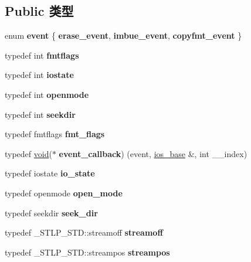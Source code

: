 \subsection*{Public 类型}
\begin{DoxyCompactItemize}
\item 
\mbox{\label{classios__base_ac76e71dcaa651be2091a967c0e2f7369}} 
enum {\bfseries event} \{ {\bfseries erase\+\_\+event}, 
{\bfseries imbue\+\_\+event}, 
{\bfseries copyfmt\+\_\+event}
 \}
\item 
\mbox{\label{classios__base_a74902bbe102cf0cbbbe7c93a47373581}} 
typedef int {\bfseries fmtflags}
\item 
\mbox{\label{classios__base_a71b7ab8328b5c7e7ec684acbdf14eddd}} 
typedef int {\bfseries iostate}
\item 
\mbox{\label{classios__base_a60aa901230527f9e3c253b9f39006925}} 
typedef int {\bfseries openmode}
\item 
\mbox{\label{classios__base_aac08884b8dcc93be02c6c4de662bbea0}} 
typedef int {\bfseries seekdir}
\item 
\mbox{\label{classios__base_aad2e02b9eec0d58b71c5679ce7131c87}} 
typedef fmtflags {\bfseries fmt\+\_\+flags}
\item 
\mbox{\label{classios__base_a03a432ee2de748cea417811cf08b4419}} 
typedef \hyperlink{interfacevoid}{void}($\ast$ {\bfseries event\+\_\+callback}) (event, \hyperlink{classios__base}{ios\+\_\+base} \&, int \+\_\+\+\_\+index)
\item 
\mbox{\label{classios__base_a0d8a9479167369badef7f318e32e71b1}} 
typedef iostate {\bfseries io\+\_\+state}
\item 
\mbox{\label{classios__base_af73e46714d39303f5431d3f3a870d21b}} 
typedef openmode {\bfseries open\+\_\+mode}
\item 
\mbox{\label{classios__base_a64db83c79b87d4ff7b6f29f57456dc52}} 
typedef seekdir {\bfseries seek\+\_\+dir}
\item 
\mbox{\label{classios__base_afc8bfbd4b57c3babb637ba9ea3b017ee}} 
typedef \+\_\+\+S\+T\+L\+P\+\_\+\+S\+T\+D\+::streamoff {\bfseries streamoff}
\item 
\mbox{\label{classios__base_a01830a98d2bb384b13344e8939616ff4}} 
typedef \+\_\+\+S\+T\+L\+P\+\_\+\+S\+T\+D\+::streampos {\bfseries streampos}
\end{DoxyCompactItemize}
